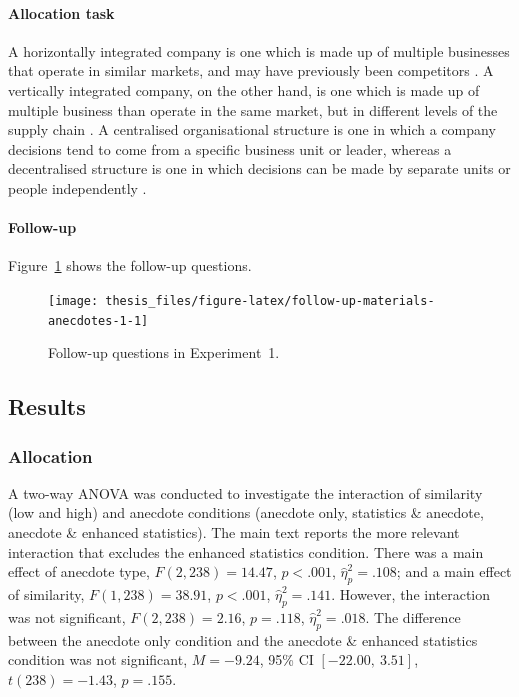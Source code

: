 \documentclass[a4paper, nobind, dvipsnames]{templates/ociamthesis}
\theoremstyle{definition}
\theoremstyle{definition}
\theoremstyle{definition}
\theoremstyle{definition}
\theoremstyle{remark}
\begin{document}
\hypertarget{allocation-materials-anecdotes-1}{%
\paragraph{Allocation task}\label{allocation-materials-anecdotes-1}}

A horizontally integrated company is one which is made up of multiple businesses
that operate in similar markets, and may have previously been competitors
\autocite{gaughan2012}. A vertically integrated company, on the other hand, is one which
is made up of multiple business than operate in the same market, but in
different levels of the supply chain \autocite{gaughan2012a}. A centralised
organisational structure is one in which a company decisions tend to come from a
specific business unit or leader, whereas a decentralised structure is one in
which decisions can be made by separate units or people independently
\autocite{kenton2021}.

\hypertarget{follow-up-materials-anecdotes-1}{%
\paragraph{Follow-up}\label{follow-up-materials-anecdotes-1}}

Figure~\ref{fig:follow-up-materials-anecdotes-1} shows the follow-up questions.



\begin{figure}
\texttt{[image: thesis\_files/figure-latex/follow-up-materials-anecdotes-1-1]} \caption{Follow-up questions in Experiment~1.}\label{fig:follow-up-materials-anecdotes-1}
\end{figure}

\hypertarget{results-anecdotes-1-appendix}{%
\subsection{Results}\label{results-anecdotes-1-appendix}}

\subsubsection{Allocation}

A two-way ANOVA was conducted to investigate the interaction of similarity (low
and high) and anecdote conditions (anecdote only, statistics \& anecdote,
anecdote \& enhanced statistics). The main text reports the more relevant
interaction that excludes the enhanced statistics condition. There was a main
effect of anecdote type, \(F(2, 238) = 14.47\), \(p < .001\), \(\hat{\eta}^2_p = .108\); and a main
effect of similarity, \(F(1, 238) = 38.91\), \(p < .001\), \(\hat{\eta}^2_p = .141\). However, the
interaction was not significant,
\(F(2, 238) = 2.16\), \(p = .118\), \(\hat{\eta}^2_p = .018\). The difference between
the anecdote only condition and the anecdote \& enhanced statistics condition was
not significant, \(M = -9.24\), 95\% CI \([-22.00,~3.51]\), \(t(238) = -1.43\), \(p = .155\).
\end{document}
